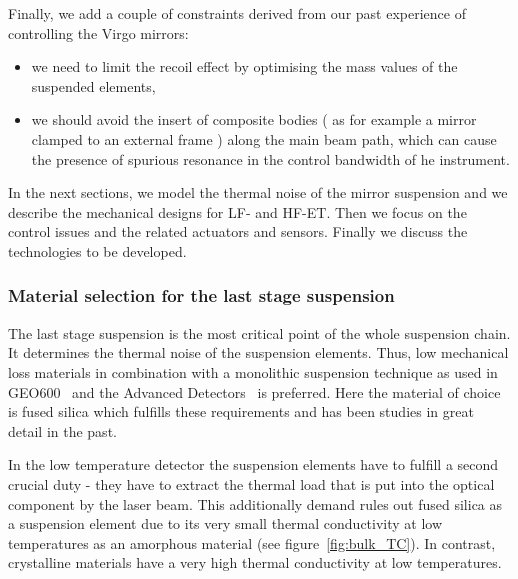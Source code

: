 Finally, we add a couple of constraints derived from our past experience of  controlling the Virgo mirrors: 
\begin{itemize}
\item{we need to limit   the recoil effect  by optimising  the mass values of the suspended elements,}  
\item{we should   avoid   the insert  of  composite bodies ( as for example a mirror clamped to an external frame ) along the main beam path, which can cause the presence of spurious resonance in the control bandwidth of he instrument.}
\end{itemize}
In the next sections,  we model the thermal noise of the mirror suspension and  we describe the mechanical designs  for LF- and HF-ET.  Then we focus on the control issues and the related actuators and sensors. Finally we discuss the technologies to be developed.

\FloatBarrier
\subsubsection{Material selection for the last stage suspension}
\label{sec:mat_lss}


The last stage suspension is the most critical point of the whole suspension chain. It determines the thermal noise of the suspension elements. Thus, low mechanical loss materials in combination with a monolithic suspension technique as used in GEO600~\cite{Plissi1998,Willke2002} and the Advanced Detectors~\cite{aLIGO,Robertson2002,Cumming2009} is preferred. Here the material of choice is fused silica which fulfills these requirements and has been studies in great detail in the past. 

In the low temperature detector the suspension elements have to fulfill a second crucial duty - they have to extract the thermal load that is put into the optical component by the laser beam. This additionally demand rules out fused silica as a suspension element due to its very small thermal conductivity at low temperatures as an amorphous material (see figure~\ref{fig:bulk_TC}). In contrast, crystalline materials have a very high thermal conductivity at low temperatures. 

